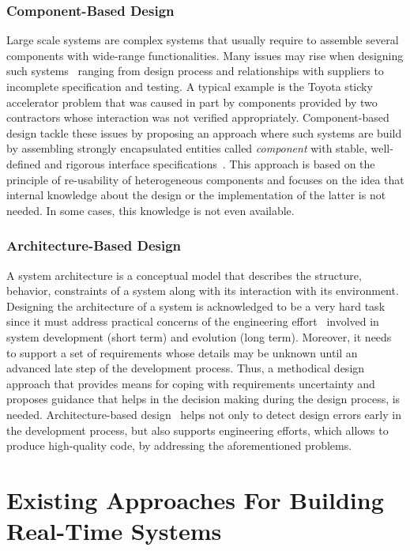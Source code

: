 \subsubsection{Component-Based Design}

Large scale systems are complex systems that usually require to assemble several
components with wide-range functionalities. Many issues may rise when designing such 
systems~\cite{intro:cb} ranging from design process and relationships with suppliers to 
incomplete specification and testing. A typical example is the Toyota sticky accelerator 
problem that was caused in part by components provided by two contractors whose interaction 
was not verified appropriately.
Component-based design tackle these issues by proposing an approach where such systems
are build by assembling strongly encapsulated entities called \emph{component} with 
stable, well-defined and rigorous interface specifications~\cite{intro:cb2}.
This approach is based on the principle of re-usability of heterogeneous components and focuses
on the idea that internal knowledge about the design or the implementation of the latter is
not needed. In some cases, this knowledge is not even available. 

\subsubsection{Architecture-Based Design}

A system architecture is a conceptual model that describes the structure, behavior, constraints 
of a system along with its interaction with its environment. Designing the architecture of 
a system is acknowledged to be a very hard task since it must address practical concerns
of the engineering effort~\cite{intro:ab2} involved in system development (short term) 
and evolution (long term). Moreover, it needs to support a set of requirements whose
details may be unknown until an advanced late step of the development process. 
Thus, a methodical design approach that provides means for coping with requirements uncertainty
and proposes guidance that helps in the decision making during the design process, is needed.
Architecture-based design~\cite{intro:ab} helps not only to detect design errors early in the 
development process, but also supports engineering efforts, which allows to produce 
high-quality code, by addressing the aforementioned problems.

\section{Existing Approaches For Building Real-Time Systems}

